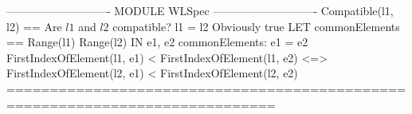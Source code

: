 \documentclass[preview, border={5pt 0pt 5pt 1pt}]{standalone}
\begin{document}
\begin{tla}
---------------------------- MODULE WLSpec ----------------------------
Compatible(l1, l2) == \* Are $l1$ and $l2$ compatible?
    \/ l1 = l2 \* Obviously true
    \/ LET commonElements == Range(l1) \cap Range(l2)
       IN \A e1, e2 \in commonElements:
            \/ e1 = e2
            \/ FirstIndexOfElement(l1, e1) < FirstIndexOfElement(l1, e2) 
               <=> FirstIndexOfElement(l2, e1) < FirstIndexOfElement(l2, e2)
=============================================================================
\end{tla}
\begin{tlatex}
\@x{}\moduleLeftDash{}\moduleRightDash\@xx{}%
%
%
\@xx{}%
%
%
\@xx{}%
%
%
\@x{}\bottombar\@xx{}%
\end{tlatex}
\end{document}
